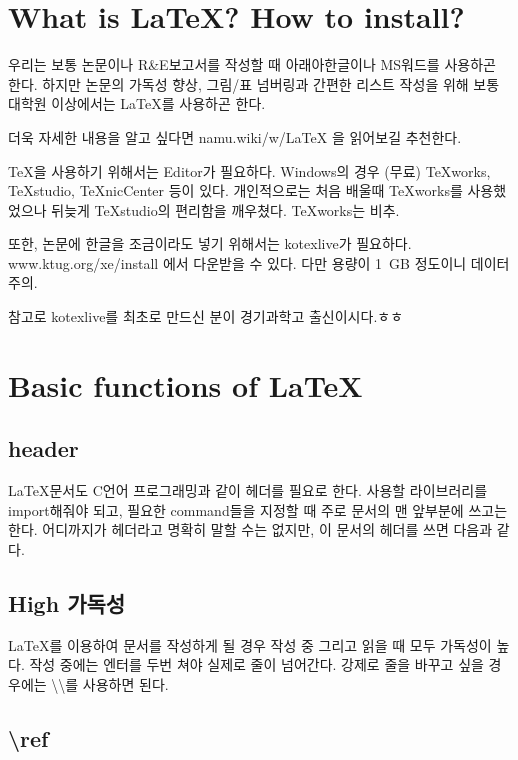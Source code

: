 \documentclass[11pt]{article}
\renewcommand\thesection{\Roman{section}} %
\renewcommand\thesubsection{\arabic{subsection}} %
\begin{document}

\section{What is \LaTeX ? How to install?}\label{intro}
우리는 보통 논문이나 R\&E보고서를 작성할 때 아래아한글이나 MS워드를 사용하곤 한다. 하지만 논문의 가독성 향상, 그림/표 넘버링과 간편한 리스트 작성을 위해 보통 대학원 이상에서는 \LaTeX 를 사용하곤 한다. 

더욱 자세한 내용을 알고 싶다면 namu.wiki/w/LaTeX 을 읽어보길 추천한다.

TeX을 사용하기 위해서는 Editor가 필요하다.
Windows의 경우 (무료) TeXworks, TeXstudio, TeXnicCenter 등이 있다. 개인적으로는 처음 배울때 TeXworks를 사용했었으나 뒤늦게 TeXstudio의 편리함을 깨우쳤다. TeXworks는 비추.

또한, 논문에 한글을 조금이라도 넣기 위해서는 kotexlive가 필요하다. 
www.ktug.org/xe/install 에서 다운받을 수 있다. 다만 용량이 1~GB 정도이니 데이터 
주의.

참고로 kotexlive를 최초로 만드신 분이 경기과학고 출신이시다.ㅎㅎ 

\section{Basic functions of \LaTeX}
\subsection{header}
\LaTeX 문서도 C언어 프로그래밍과 같이 헤더를 필요로 한다. 사용할 라이브러리를 import해줘야 되고, 필요한 command들을 지정할 때 주로 문서의 맨 앞부분에 쓰고는 한다. 어디까지가 헤더라고 명확히 말할 수는 없지만, 이 문서의 헤더를 쓰면 다음과 같다.

\subsection{High 가독성}
\LaTeX 를 이용하여 문서를 작성하게 될 경우 작성 중 그리고 읽을 때 모두 가독성이 높다.
작성 중에는 엔터를 두번 쳐야 실제로 줄이 넘어간다. 강제로 줄을 바꾸고 싶을 경우에는 \textbackslash \textbackslash 를 사용하면 된다.

\subsection{\textbackslash ref}
\end{document}
